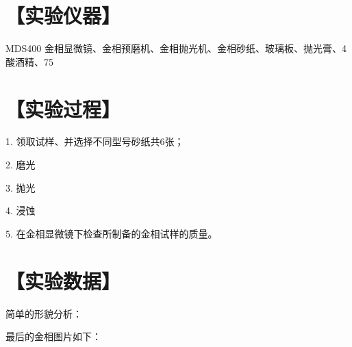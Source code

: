 \documentclass[a4paper,utf8]{article}
\begin{document}
\section*{【实验仪器】}%
MDS400 金相显微镜、金相预磨机、金相抛光机、金相砂纸、玻璃板、抛光膏、4%
酸酒精、75%
\section*{【实验过程】}%

1. 领取试样、并选择不同型号砂纸共6张；

2. 磨光

3. 抛光

4. 浸蚀

5. 在金相显微镜下检查所制备的金相试样的质量。


\section*{【实验数据】}
简单的形貌分析：


最后的金相图片如下：
\end{document}
